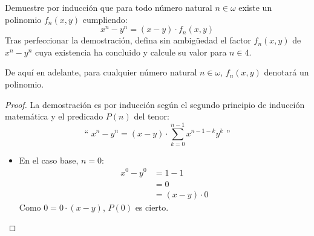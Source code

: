 \documentclass[12pt]{article}
\begin{document}
    \begin{ejercicio}[Inducción]
        Demuestre por inducción que para todo número natural $n\in\omega$ existe un polinomio $f_n(x, y)$ cumpliendo:
        \begin{equation*}
            x^n - y^n = (x-y)\cdot f_n(x, y)
        \end{equation*}
        Tras perfeccionar la demostración, defina sin ambigüedad el factor $f_n(x, y)$ de $x^n - y^n$ cuya existencia ha concluido y calcule su valor para $n\in 4$.

        \begin{notacion}
            De aquí en adelante, para cualquier número natural $n\in\omega$, $f_n(x, y)$ denotará un polinomio.
        \end{notacion}
        \begin{proof}
            La demostración es por inducción según el segundo principio de inducción matemática y el predicado $P(n)$ del tenor:
            \begin{equation*}
                \text{`` }x^n - y^n = (x-y)\cdot \sum_{k=0}^{n-1}x^{n-1-k}y^k\text{ ''}
            \end{equation*}
    
            \begin{itemize}
                \item En el caso base, $n=0$:
                    \begin{align*}
                        x^0 - y^0 &= 1 - 1 \\&= 0 \\&= (x-y)\cdot 0
                    \end{align*}
                    Como $0 = 0\cdot (x-y)$, $P(0)$ es cierto.
    

\end{itemize}
\end{proof}
\end{ejercicio}
\end{document}
